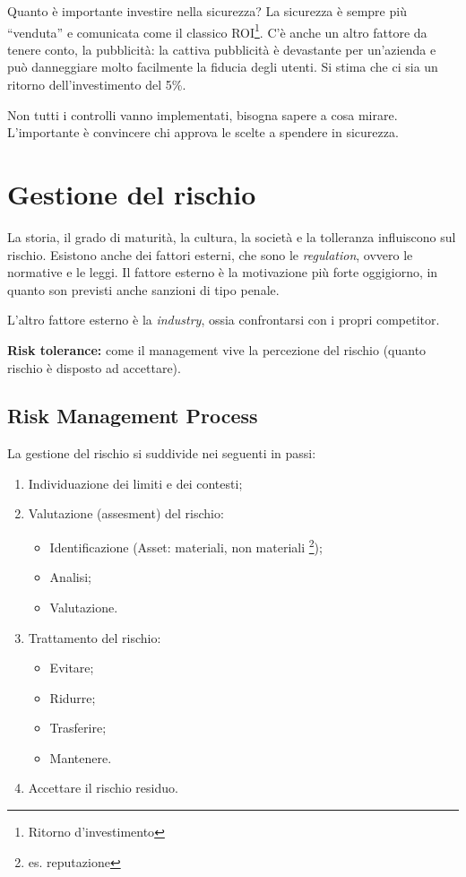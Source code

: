 \label{riskMng}

Quanto è importante investire nella sicurezza? La sicurezza è sempre più
``venduta'' e comunicata come il classico ROI\footnote{Ritorno d'investimento}.
C'è anche un altro fattore da tenere conto, la pubblicità: la cattiva
pubblicità è devastante per un'azienda e può danneggiare molto
facilmente la fiducia degli utenti. Si stima che ci sia un ritorno
dell'investimento del 5\%.

Non tutti i controlli vanno implementati, bisogna sapere a cosa mirare.
L'importante è convincere chi approva le scelte a spendere in sicurezza.



\chapter{Gestione del rischio}

La storia, il grado di maturità, la cultura, la società e la tolleranza
influiscono sul rischio. Esistono anche dei fattori esterni, che sono le
\textit{regulation}, ovvero le normative e le leggi. Il fattore esterno è la
motivazione più forte oggigiorno, in quanto son previsti anche sanzioni di tipo
penale.

L'altro fattore esterno è la \textit{industry}, ossia confrontarsi con i propri
competitor.

\textbf{Risk tolerance:} come il management vive la percezione del rischio
(quanto rischio è disposto ad accettare).

\section{Risk Management Process}
La gestione del rischio si suddivide nei seguenti in passi:
\begin{enumerate}
\item Individuazione dei limiti e dei contesti;
\item Valutazione (assesment) del rischio:
\begin{itemize}
  \item Identificazione (Asset: materiali, non materiali
  \footnote{es. reputazione});
  \item Analisi;
  \item Valutazione.
\end{itemize}
\item Trattamento del rischio:
\begin{itemize}
  \item Evitare;
  \item Ridurre;
  \item Trasferire;
  \item Mantenere.
\end{itemize}
\item Accettare il rischio residuo.
\end{enumerate}

